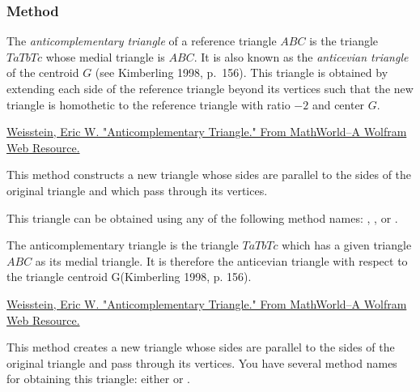 \subsubsection{Method } %
\label{ssub:method_triangle_anti}

The \emph{anticomplementary triangle} of a reference triangle $ABC$ is the triangle $TaTbTc$ whose medial triangle is $ABC$. It is also known as the \emph{anticevian triangle} of the centroid $G$ (see Kimberling 1998, p.~156). This triangle is obtained by extending each side of the reference triangle beyond its vertices such that the new triangle is homothetic to the reference triangle with ratio $-2$ and center $G$.\begin{flushright}
  \small
\href{https://mathworld.wolfram.com/AnticomplementaryTriangle.html}{Weisstein, Eric W. "Anticomplementary Triangle." From MathWorld--A Wolfram Web Resource.}
\end{flushright}

\medskip
\noindent
This method constructs a new triangle whose sides are parallel to the sides of the original triangle and which pass through its vertices.

\medskip
\noindent
This triangle can be obtained using any of the following method names: , , or .

\vspace{1em}



The anticomplementary triangle is the triangle $TaTbTc$ which has a given triangle $ABC$ as its medial triangle. It is therefore the anticevian triangle with respect to the triangle centroid G(Kimberling 1998, p. 156).\begin{flushright}
  \small
 \href{https://mathworld.wolfram.com/AnticomplementaryTriangle.html}{Weisstein, Eric W. "Anticomplementary Triangle." From MathWorld--A Wolfram Web Resource.}
\end{flushright}

This method creates a new triangle whose sides are parallel to the sides of the original triangle and pass through its vertices.
You have several method names for obtaining this triangle: either   or .

\vspace{1em}

